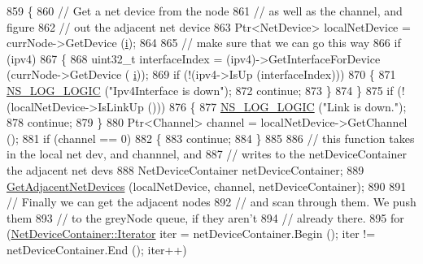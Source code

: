 \begin{DoxyCode}
859             \{
860               \textcolor{comment}{// Get a net device from the node}
861               \textcolor{comment}{// as well as the channel, and figure}
862               \textcolor{comment}{// out the adjacent net device}
863               Ptr<NetDevice> localNetDevice = currNode->GetDevice (\hyperlink{bernuolliDistribution_8m_a6f6ccfcf58b31cb6412107d9d5281426}{i});
864 
865               \textcolor{comment}{// make sure that we can go this way}
866               \textcolor{keywordflow}{if} (ipv4)
867                 \{
868                   uint32\_t interfaceIndex = (ipv4)->GetInterfaceForDevice (currNode->GetDevice (
      \hyperlink{bernuolliDistribution_8m_a6f6ccfcf58b31cb6412107d9d5281426}{i}));
869                   \textcolor{keywordflow}{if} (!(ipv4->IsUp (interfaceIndex)))
870                     \{
871                       \hyperlink{group__logging_ga88acd260151caf2db9c0fc84997f45ce}{NS\_LOG\_LOGIC} (\textcolor{stringliteral}{"Ipv4Interface is down"});
872                       \textcolor{keywordflow}{continue};
873                     \}
874                 \}
875               \textcolor{keywordflow}{if} (!(localNetDevice->IsLinkUp ()))
876                 \{
877                   \hyperlink{group__logging_ga88acd260151caf2db9c0fc84997f45ce}{NS\_LOG\_LOGIC} (\textcolor{stringliteral}{"Link is down."});
878                   \textcolor{keywordflow}{continue};
879                 \}
880               Ptr<Channel> channel = localNetDevice->GetChannel ();
881               \textcolor{keywordflow}{if} (channel == 0)
882                 \{ 
883                   \textcolor{keywordflow}{continue};
884                 \}
885 
886               \textcolor{comment}{// this function takes in the local net dev, and channnel, and}
887               \textcolor{comment}{// writes to the netDeviceContainer the adjacent net devs}
888               NetDeviceContainer netDeviceContainer;
889               \hyperlink{classns3_1_1Ipv4NixVectorRouting_a1037f3752d6583eca8cd83c72e0673ea}{GetAdjacentNetDevices} (localNetDevice, channel, netDeviceContainer);
890 
891               \textcolor{comment}{// Finally we can get the adjacent nodes}
892               \textcolor{comment}{// and scan through them.  We push them}
893               \textcolor{comment}{// to the greyNode queue, if they aren't }
894               \textcolor{comment}{// already there.}
895               \textcolor{keywordflow}{for} (\hyperlink{classns3_1_1NetDeviceContainer_a45709bb572f975569ed985fa89b132f8}{NetDeviceContainer::Iterator} iter = netDeviceContainer.Begin
       (); iter != netDeviceContainer.End (); iter++)

\end{DoxyCode}

